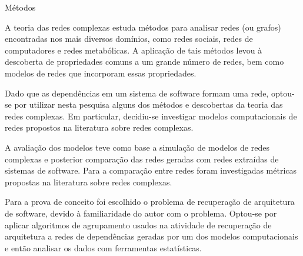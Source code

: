 \begin{section}{Métodos}
	
	A teoria das redes complexas estuda métodos para analisar redes (ou grafos) encontradas nos mais diversos domínios, como redes sociais, redes de computadores e redes metabólicas. A aplicação de tais métodos levou à descoberta de propriedades comuns a um grande número de redes, bem como modelos de redes que incorporam essas propriedades.
	
	Dado que as dependências em um sistema de software formam uma rede, optou-se por utilizar nesta pesquisa alguns dos métodos e descobertas da teoria das redes complexas. Em particular, decidiu-se investigar modelos computacionais de redes propostos na literatura sobre redes complexas.

	A avaliação dos modelos teve como base a simulação de modelos de redes complexas e posterior comparação das redes geradas com redes extraídas de sistemas de software. Para a comparação entre redes foram investigadas métricas propostas na literatura sobre redes complexas.
	
	Para a prova de conceito foi escolhido o problema de recuperação de arquitetura de software, devido à familiaridade do autor com o problema. Optou-se por aplicar algoritmos de agrupamento usados na atividade de recuperação de arquitetura a redes de dependências geradas por um dos modelos computacionais e então analisar os dados com ferramentas estatísticas.

\end{section}


